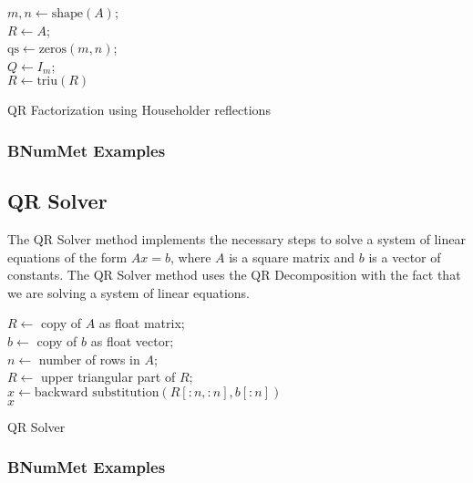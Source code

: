 \begin{algorithm}[H]{
\label{alg:QR Factorization using Householder reflections}
\SetAlgoLined
{}
$m, n \gets \text{shape}(A)$;\\
$R \gets A$;\\
$\text{qs} \gets \text{zeros}(m, n)$;\\
\For{$k \in [0, n)$}{
    $x \gets R_{k:, k}$;\\
    $q_k \gets \text{sign}(x_0) \times \text{norm}(x) \times I_{x, 1} + x$;\\
    $q_k \gets q_k / \text{norm}(q_k)$; \\
    $R_{k:, k:} \gets R_{k:, k:} - 2q_k(q_k^TR_{k:, k:})$ ;\\
}
$ Q \gets I_m $;\\
$R \gets \text{triu}(R)$\;
\;
}
\caption{QR Factorization using Householder reflections}

\end{algorithm}
\subsubsection*{BNumMet Examples}


\subsection*{QR Solver}
The QR Solver method implements the necessary steps to solve a system of linear equations of the form $Ax = b$, where $A$ is a square matrix and $b$ is a vector of constants. The QR Solver method uses the QR Decomposition with the fact that we are solving a system of linear equations.

\begin{algorithm}[H]
\label{alg:QR Solver}
\SetAlgoLined
\DontPrintSemicolon
{}
$R \gets$ copy of $A$ as float matrix;\\
$b \gets$ copy of $b$ as float vector;\\
$n \gets$ number of rows in $A$;\\
$R \gets$ upper triangular part of $R$;\\
$x \gets \text{backward substitution}(R[:n,:n], b[:n])$\\
\Return $x$
\caption{QR Solver}

\end{algorithm}
\subsubsection*{BNumMet Examples}
